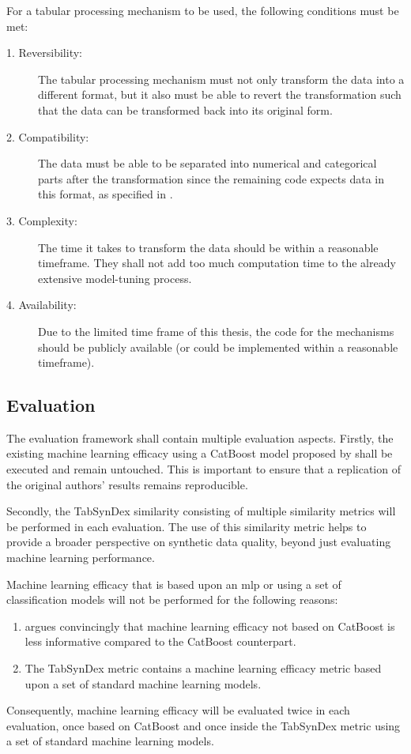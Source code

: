 For a tabular processing mechanism to be used, the following conditions must be met:

\begin{description}
	\item[1. Reversibility:] The tabular processing mechanism must not only transform the data into a different format, but it also must be able to revert the transformation
	      such that the data can be transformed back into its original form.
	\item[2. Compatibility:] The data must be able to be separated into numerical and categorical parts after the transformation
	      since the remaining code expects data in this format, as specified in .
	\item[3. Complexity:] The time it takes to transform the data should be within a reasonable timeframe. They shall not add too much computation time to the already extensive \gls{model}-tuning process.
	\item[4. Availability:] Due to the limited time frame of this thesis, the code for the mechanisms should be publicly available (or could be implemented within a reasonable timeframe).
\end{description}

\subsection[]{Evaluation}
\label{ch:conceptualDesign-Evaluation}
The evaluation framework shall contain multiple evaluation aspects.
Firstly, the existing machine learning efficacy using a CatBoost \gls{model} proposed by \cite{kotelnikov2022TabDDPMModellingTabular} shall be executed and remain untouched.
This is important to ensure that a replication of the original authors' results remains reproducible.

Secondly, the TabSynDex \cite{chundawat2022UniversalMetricRobust} similarity consisting of multiple similarity metrics will be performed in each evaluation.
The use of this similarity metric helps to provide a broader perspective on synthetic data quality, beyond just evaluating machine learning performance.

Machine learning efficacy that is based upon an \gls{mlp} or using a set of classification \glspl{model} will not be performed for the following reasons:
\begin{enumerate}
	\item \textcite{kotelnikov2022TabDDPMModellingTabular} argues convincingly that machine learning efficacy not based on CatBoost is less informative compared to the CatBoost counterpart.
	\item The TabSynDex metric contains a machine learning efficacy metric based upon a set of standard machine learning \glspl{model}.
\end{enumerate}
Consequently, machine learning efficacy will be evaluated twice in each evaluation, once based on CatBoost and once inside the TabSynDex metric using a set of standard machine learning \glspl{model}.

